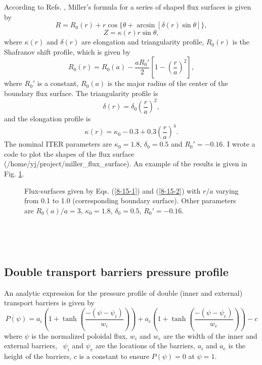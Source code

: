 \documentclass{article}
\begin{document}
According to Refs. {\cite{chen2010,miller1998}}, Miller's formula for a series
of shaped flux surfaces is given by
\begin{equation}
  \label{8-15-1} R = R_0 (r) + r \cos \{ \theta + \arcsin [\delta (r) \sin
  \theta] \},
\end{equation}
\begin{equation}
  \label{8-15-2} Z = \kappa (r) r \sin \theta,
\end{equation}
where $\kappa (r)$ and $\delta (r)$ are elongation and triangularity profile,
$R_0 (r)$ is the Shafranov shift profile, which is given by
\begin{equation}
  R_0 (r) = R_0 (a) - \frac{a R_0'}{2} \left[ 1 - \left( \frac{r}{a} \right)^2
  \right],
\end{equation}
where $R_0'$ is a constant, $R_0 (a)$ is the major radius of the center of the
boundary flux surface. The triangularity profile is
\begin{equation}
  \delta (r) = \delta_0  \left( \frac{r}{a} \right)^2,
\end{equation}
and the elongation profile is
\begin{equation}
  \kappa (r) = \kappa_0 - 0.3 + 0.3 \left( \frac{r}{a} \right)^4 .
\end{equation}
The nominal ITER parameters are $\kappa_0 = 1.8$, $\delta_0 = 0.5$ and $R_0' =
- 0.16$. I wrote a code to plot the shapes of the flux surface
(/home/yj/project/miller\_flux\_surface). An example of the results is given
in Fig. \ref{8-15-4}.

\begin{figure}[h]
  
  \caption{\label{8-15-4}Flux-surfaces given by Eqs. (\ref{8-15-1}) and
  (\ref{8-15-2}) with $r / a$ varying from 0.1 to 1.0 (corresponding boundary
  surface). Other parameters are $R_0 (a) / a = 3$, $\kappa_0 = 1.8$,
  $\delta_0 = 0.5$, $R_0' = - 0.16$.}
\end{figure}

\

\

\subsection{Double transport barriers pressure profile}

An analytic expression for the pressure profile of double (inner and external)
transport barriers is given by
\begin{equation}
  \label{5-26-5} P (\psi) = a_i \left( 1 + \tanh \left( \frac{- (\psi -
  \psi_i)}{w_i} \right) \right) + a_e \left( 1 + \tanh \left( \frac{- (\psi -
  \psi_e)}{w_e} \right) \right) - c
\end{equation}
where $\psi$ is the normalized poloidal flux, $w_i$ and $w_e$ are the width of
the inner and external barriers, \ $\psi_i$ and $\psi_e$ are the locations of
the barriers, $a_i$ and $a_e$ is the height of the barriers, $c$ is a constant
to ensure $P (\psi) = 0$ at $\psi = 1$.
\end{document}
